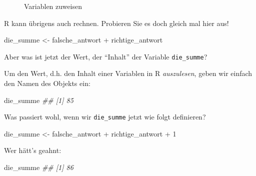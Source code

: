 \documentclass[
  letterpaper,
]{scrbook}
\newenvironment{Shaded}{\begin{snugshade}}{\end{snugshade}}
\newcommand{\DecValTok}[1]{\textcolor[rgb]{0.68,0.00,0.00}{#1}}
\newcommand{\DocumentationTok}[1]{\textcolor[rgb]{0.37,0.37,0.37}{\textit{#1}}}
\newcommand{\NormalTok}[1]{\textcolor[rgb]{0.00,0.23,0.31}{#1}}
\newcommand{\OtherTok}[1]{\textcolor[rgb]{0.00,0.23,0.31}{#1}}
\newcommand{\SpecialCharTok}[1]{\textcolor[rgb]{0.37,0.37,0.37}{#1}}
\theoremstyle{definition}
\theoremstyle{definition}
\theoremstyle{definition}
\theoremstyle{remark}
\begin{document}
\begin{figure}


\caption{\label{fig-def-vars}Variablen zuweisen}

\end{figure}%

R kann übrigens auch rechnen. Probieren Sie es doch gleich mal hier aus!

\begin{Shaded}
\begin{Highlighting}[]
\NormalTok{die\_summe }\OtherTok{\textless{}{-}}\NormalTok{ falsche\_antwort }\SpecialCharTok{+}\NormalTok{ richtige\_antwort}
\end{Highlighting}
\end{Shaded}

Aber was ist jetzt der Wert, der \enquote{Inhalt} der Variable
\texttt{die\_summe}?

Um den Wert, d.h. den Inhalt einer Variablen in R \emph{auszulesen},
geben wir einfach den Namen des Objekts ein:

\begin{Shaded}
\begin{Highlighting}[]
\NormalTok{die\_summe}
\DocumentationTok{\#\# [1] 85}
\end{Highlighting}
\end{Shaded}

Was passiert wohl, wenn wir \texttt{die\_summe} jetzt wie folgt
definieren?

\begin{Shaded}
\begin{Highlighting}[]
\NormalTok{die\_summe }\OtherTok{\textless{}{-}}\NormalTok{ falsche\_antwort }\SpecialCharTok{+}\NormalTok{ richtige\_antwort }\SpecialCharTok{+} \DecValTok{1}
\end{Highlighting}
\end{Shaded}

Wer hätt's geahnt:

\begin{Shaded}
\begin{Highlighting}[]
\NormalTok{die\_summe}
\DocumentationTok{\#\# [1] 86}
\end{Highlighting}
\end{Shaded}
\end{document}
